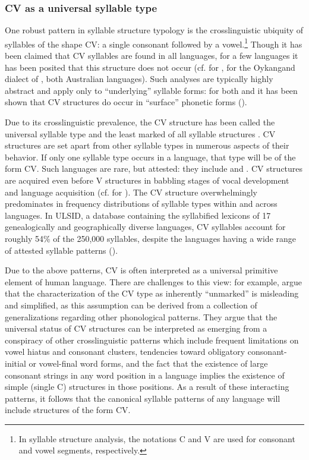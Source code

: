 \subsubsection{{CV} {as} {a} {universal} {syllable} {type}}\label{sec:1.1.2.1}

 One robust pattern in syllable structure typology is the crosslinguistic ubiquity of syllables of the shape CV: a single consonant followed by a vowel.\footnote{{In syllable structure analysis, the notations C and V are used for consonant and vowel segments, respectively.}} Though it has been claimed that CV syllables are found in all languages, for a few languages it has been posited that this structure does not occur (cf. \citealt{BreenPensalfini1999} for , \citealt{Sommer1969} for the Oykangand dialect of , both Australian languages). Such analyses are typically highly abstract and apply only to ``underlying'' syllable forms: for both  and  it has been shown that CV structures do occur in ``surface'' phonetic forms (\citealt{Anderson2000,Sommer1969,Sommer1981}).

  Due to its crosslinguistic prevalence, the CV structure has been called the universal syllable type and the least marked of all syllable structures \citep{Zec2007}. CV structures are set apart from other syllable types in numerous aspects of their behavior. If only one syllable type occurs in a language, that type will be of the form CV. Such languages are rare, but attested: they include  \citep{Maddieson2011} and  \citep{Blevins1995}. CV structures are acquired even before V structures in babbling stages of vocal development and language acquisition (cf. \citealt{LeveltEtAl2000} for ). The CV structure overwhelmingly predominates in frequency distributions of syllable types within and across languages. In ULSID, a database containing the syllabified lexicons of 17 genealogically and geographically diverse languages, CV syllables account for roughly 54\% of the 250,000 syllables, despite the languages having a wide range of attested syllable patterns (\citealt{ValléeEtAl2009}).

  Due to the above patterns, CV is often interpreted as a universal primitive element of human language. There are challenges to this view: for example, \citet{BellHooper1978} argue that the characterization of the CV type as inherently ``unmarked'' is misleading and simplified, as this assumption can be derived from a collection of generalizations regarding other phonological patterns. They argue that the universal status of CV structures can be interpreted as emerging from a conspiracy of other crosslinguistic patterns which include frequent limitations on vowel hiatus and consonant clusters, tendencies toward obligatory consonant-initial or vowel-final word forms, and the fact that the existence of large consonant strings in any word position in a language implies the existence of simple (single C) structures in those positions. As a result of these interacting patterns, it follows that the canonical syllable patterns of any language will include structures of the form CV.

